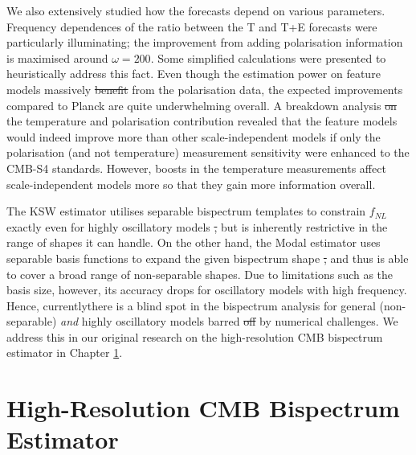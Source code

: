 \documentclass[a4paper,12pt,times,custombib,print,index]{Classes/PhDThesisPSnPDF} %
\providecommand{\DIFadd}[1]{{\protect\color{blue}\uwave{#1}}} %
\providecommand{\DIFdel}[1]{{\protect\color{red}\sout{#1}}}                      %
\providecommand{\DIFaddbegin}{} %
\providecommand{\DIFaddend}{} %
\providecommand{\DIFdelbegin}{} %
\providecommand{\DIFdelend}{} %
\newcommand{\DIFscaledelfig}{0.5}
\newlength{\DIFdelgraphicswidth} %
\newlength{\DIFdelgraphicsheight} %
\newcommand{\DIFaddincludegraphics}[2][]{{\color{blue}\fbox{\DIFOincludegraphics[#1]{#2}}}} %
\newcommand{\DIFdelincludegraphics}[2][]{%
\sbox{\DIFdelgraphicsbox}{\DIFOincludegraphics[#1]{#2}}%
\settoboxwidth{\DIFdelgraphicswidth}{\DIFdelgraphicsbox} %
\settoboxtotalheight{\DIFdelgraphicsheight}{\DIFdelgraphicsbox} %
\scalebox{\DIFscaledelfig}{%
\parbox[b]{\DIFdelgraphicswidth}{\usebox{\DIFdelgraphicsbox}\\[-\baselineskip] \rule{\DIFdelgraphicswidth}{0em}}\llap{\resizebox{\DIFdelgraphicswidth}{\DIFdelgraphicsheight}{%
\setlength{\unitlength}{\DIFdelgraphicswidth}%
\begin{picture}(1,1)%
\thicklines\linethickness{2pt} %
{\color[rgb]{1,0,0}\put(0,0){\framebox(1,1){}}}%
{\color[rgb]{1,0,0}\put(0,0){\line( 1,1){1}}}%
{\color[rgb]{1,0,0}\put(0,1){\line(1,-1){1}}}%
\end{picture}%
}\hspace*{3pt}}} %
} %
\DeclareRobustCommand{\DIFaddbegin}{\DIFOaddbegin \let\includegraphics\DIFaddincludegraphics} %
\DeclareRobustCommand{\DIFaddend}{\DIFOaddend \let\includegraphics\DIFOincludegraphics} %
\DeclareRobustCommand{\DIFdelbegin}{\DIFOdelbegin \let\includegraphics\DIFdelincludegraphics} %
\DeclareRobustCommand{\DIFdelend}{\DIFOaddend \let\includegraphics\DIFOincludegraphics} %
\begin{document}
We also extensively studied how the forecasts depend on various parameters. Frequency dependences of the ratio between the T and T+E forecasts were particularly illuminating; the improvement from adding polarisation information is maximised around $\omega = 200$. Some simplified calculations were presented to heuristically address this fact. Even though the estimation power on feature models massively \DIFdelbegin \DIFdel{benefit }\DIFdelend \DIFaddbegin \DIFadd{benefits }\DIFaddend from the polarisation data, the expected improvements compared to Planck are quite underwhelming overall. A breakdown analysis \DIFdelbegin \DIFdel{on }\DIFdelend \DIFaddbegin \DIFadd{of }\DIFaddend the temperature and polarisation contribution revealed that the feature models would indeed improve more than other scale-independent models if only the polarisation (and not temperature) measurement sensitivity were enhanced to the CMB-S4 standards. However, boosts in the temperature measurements affect scale-independent models more so that they gain more information overall.

The KSW estimator utilises separable bispectrum templates to constrain \DIFdelbegin \DIFdel{$f_{NL}$ }\DIFdelend \DIFaddbegin \DIFadd{$f_\text{NL}$ }\DIFaddend exactly even for highly oscillatory models \DIFdelbegin \DIFdel{, }\DIFdelend but is inherently restrictive in the range of shapes it can handle. On the other hand, the Modal estimator uses separable basis functions to expand the given bispectrum shape \DIFdelbegin \DIFdel{, }\DIFdelend and thus is able to cover a broad range of non-separable shapes. Due to limitations such as the basis size, however, its accuracy drops for oscillatory models with high frequency. Hence, currently\DIFaddbegin \DIFadd{, }\DIFaddend there is a blind spot in the bispectrum analysis for general (non-separable) \textit{and} highly oscillatory models barred  \DIFdelbegin \DIFdel{off }\DIFdelend by numerical challenges. We address this in our original research on the high-resolution CMB bispectrum estimator in Chapter \ref{chapter:high_resolution_cmb_bispectrum_estimator}.

\clearpage{}
\clearpage{}\chapter{High-Resolution CMB Bispectrum Estimator} \label{chapter:high_resolution_cmb_bispectrum_estimator}

\ifpdf
    \graphicspath{{Chapter5/Figs/Raster/}{Chapter5/Figs/PDF/}{Chapter5/Figs/}}
\else
    \graphicspath{{Chapter5/Figs/Vector/}{Chapter5/Figs/}}
\fi
\end{document}

